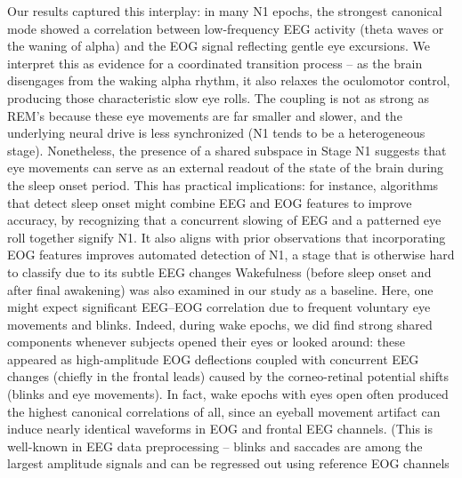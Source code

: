 Our results captured this interplay: in many N1 epochs, the strongest canonical mode showed a correlation between low-frequency EEG activity (theta waves or the waning of alpha) and the EOG signal reflecting gentle eye excursions. We interpret this as evidence for a coordinated transition process – as the brain disengages from the waking alpha rhythm, it also relaxes the oculomotor control, producing those characteristic slow eye rolls. The coupling is not as strong as REM’s because these eye movements are far smaller and slower, and the underlying neural drive is less synchronized (N1 tends to be a heterogeneous stage). Nonetheless, the presence of a shared subspace in Stage N1 suggests that eye movements can serve as an external readout of the state of the brain during the sleep onset period. This has practical implications: for instance, algorithms that detect sleep onset might combine EEG and EOG features to improve accuracy, by recognizing that a concurrent slowing of EEG and a patterned eye roll together signify N1. It also aligns with prior observations that incorporating EOG features improves automated detection of N1, a stage that is otherwise hard to classify due to its subtle EEG changes %
Wakefulness (before sleep onset and after final awakening) was also examined in our study as a baseline. Here, one might expect significant EEG–EOG correlation due to frequent voluntary eye movements and blinks. Indeed, during wake epochs, we did find strong shared components whenever subjects opened their eyes or looked around: these appeared as high-amplitude EOG deflections coupled with concurrent EEG changes (chiefly in the frontal leads) caused by the corneo-retinal potential shifts (blinks and eye movements). In fact, wake epochs with eyes open often produced the highest canonical correlations of all, since an eyeball movement artifact can induce nearly identical waveforms in EOG and frontal EEG channels. (This is well-known in EEG data preprocessing – blinks and saccades are among the largest amplitude signals and can be regressed out using reference EOG channels %
